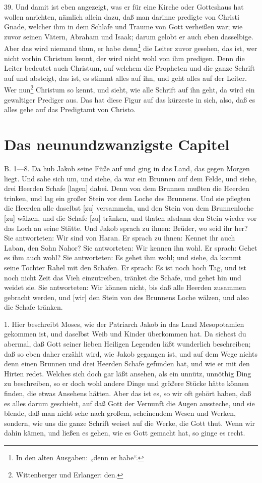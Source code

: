 39. Und damit ist eben angezeigt, was er für eine Kirche oder Gotteshaus hat wollen anrichten, nämlich allein dazu, daß man darinne predigte von Christi Gnade, welcher ihm in dem Schlafe und Traume von Gott verheißen war; wie zuvor seinen Vätern, Abraham und Isaak; darum gelobt er auch eben dasselbige. Aber das wird niemand thun, er habe denn\footnote{In den alten Ausgaben: „denn er habe“.} die Leiter zuvor gesehen, das ist, wer nicht vorhin Christum kennt, der wird nicht wohl von ihm predigen. Denn die Leiter bedeutet auch Christum, auf welchem die Propheten und die ganze Schrift auf und absteigt, das ist, es stimmt alles auf ihn, und geht alles auf der Leiter. Wer nun\footnote{Wittenberger und Erlanger: den.} Christum so kennt, und sieht, wie alle Schrift auf ihn geht, da wird ein gewaltiger Prediger aus. Das hat diese Figur auf das kürzeste in sich, also, daß es alles gehe auf das Predigtamt von Christo.



\section{Das neunundzwanzigste Capitel}
B. 1—8. Da hub Jakob seine Füße auf und ging in das Land, das gegen Morgen liegt. Und sahe sich um, und siehe, da war ein Brunnen auf dem Felde, und siehe, drei Heerden Schafe [lagen] dabei. Denn von dem Brunnen mußten die Heerden trinken, und lag ein großer Stein vor dem Loche des Brunnens. Und sie pflegten die Heerden alle daselbst [zu] versammeln, und den Stein von dem Brunnenloche [zu] wälzen, und die Schafe [zu] tränken, und thaten alsdann den Stein wieder vor das Loch an seine Stätte. Und Jakob sprach zu ihnen: Brüder, wo seid ihr her? Sie antworteten: Wir sind von Haran. Er sprach zu ihnen: Kennet ihr auch Laban, den Sohn Nahor? Sie antworteten: Wir kennen ihn wohl. Er sprach: Gehet es ihm auch wohl? Sie antworteten: Es gehet ihm wohl; und siehe, da kommt seine Tochter Rahel mit den Schafen. Er sprach: Es ist noch hoch Tag, und ist noch nicht Zeit das Vieh einzutreiben, tränket die Schafe, und gehet hin und weidet sie. Sie antworteten: Wir können nicht, bis daß alle Heerden zusammen gebracht werden, und [wir] den Stein von des Brunnens Loche wälzen, und also die Schafe tränken.

1. Hier beschreibt Moses, wie der Patriarch Jakob in das Land Mesopotamien gekommen ist, und daselbst Weib und Kinder überkommen hat. Da siehest du abermal, daß Gott seiner lieben Heiligen Legenden läßt wunderlich beschreiben; daß so eben daher erzählt wird, wie Jakob gegangen ist, und auf dem Wege nichts denn einen Brunnen und drei Heerden Schafe gefunden hat, und wie er mit den Hirten redet. Welches sich doch gar läßt ansehen, als ein unnütz, unnöthig Ding zu beschreiben, so er doch wohl andere Dinge und größere Stücke hätte können finden, die etwas Ansehens hätten. Aber das ist es, so wir oft gehört haben, daß es alles darum geschieht, auf daß Gott der Vernunft die Augen aussteche, und sie blende, daß man nicht sehe nach großem, scheinendem Wesen und Werken, sondern, wie uns die ganze Schrift weiset auf die Werke, die Gott thut. Wenn wir dahin kämen, und ließen es gehen, wie es Gott gemacht hat, so ginge es recht.


